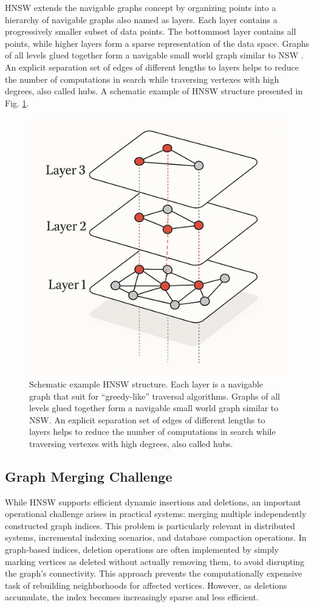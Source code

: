 \documentclass{article}
\begin{document}
HNSW \cite{hnsw} extends the navigable graphs concept by organizing points into a hierarchy of navigable graphs also named as layers. Each layer contains a progressively smaller subset of data points. The bottommost layer contains all points, while higher layers form a sparse representation of the data space. 
Graphs of all levels glued together form a navigable small world graph similar to NSW  \cite{nsw2011,nsw2012,nsw2014}. An explicit separation set of edges of different lengths to layers helps to reduce the number of computations in search while traversing vertexes with high degrees, also called hubs. A schematic example of HNSW structure presented in Fig. \ref{fig:hnsw}.

\begin{figure}
  \centering
  \includegraphics[width=0.5\linewidth]{figs/hnsw-gpt.png}
  \caption{Schematic example HNSW structure. Each layer is a navigable graph that suit for ``greedy-like'' traversal algorithms. Graphs of all levels glued together form a navigable small world graph similar to NSW. An explicit separation set of edges of different lengths to layers helps to reduce the number of computations in search while traversing vertexes with high degrees, also called hubs. }
\label{fig:hnsw}
\end{figure}

\subsection{Graph Merging Challenge}

While HNSW supports efficient dynamic insertions and deletions, an important operational challenge arises in practical systems: merging multiple independently constructed graph indices. This problem is particularly relevant in distributed systems, incremental indexing scenarios, and database compaction operations. In graph-based indices, deletion operations are often implemented by simply marking vertices as deleted without actually removing them, to avoid disrupting the graph's connectivity. This approach prevents the computationally expensive task of rebuilding neighborhoods for affected vertices. However, as deletions accumulate, the index becomes increasingly sparse and less efficient.
\end{document}
